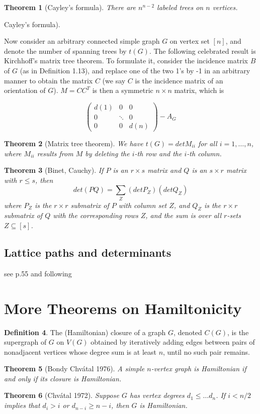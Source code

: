 \documentclass[11pt, fleqn, a4paper, landscape]{article}
\theoremstyle{plain} %
\newtheorem{thm}{Theorem}
\theoremstyle{remark} %
\theoremstyle{definition} %
\newtheorem{defi}[thm]{Definition}
\begin{document}
\begin{multicols}{3}
\begin{thm}[Cayley's formula]
There are $n^{n-2}$ labeled trees on $n$ vertices.
\end{thm}Cayley’s formula). 

Now consider an arbitrary connected simple graph $G$ on vertex set $[n]$, and denote the number of spanning trees by $t(G)$. The following celebrated result is Kirchhoff’s matrix tree theorem. To formulate it, consider the incidence matrix $B$ of $G$ (as in Definition 1.13), and replace one of the
two 1’s by -1 in an arbitrary manner to obtain the matrix $C$ (we say $C$ is the incidence matrix of an orientation of $G$). $ M = CC^T$ is then a symmetric $n \times n$ matrix, which is 

\[
\begin{pmatrix}
d(1) & 0 & 0  \\
0 & \ddots & 0  \\
0 & 0 & d(n)  
\end{pmatrix}-A_G\]

\begin{thm}[Matrix tree theorem]
We have $t(G) = det M_{ii}$ for all $i = 1, \dots , n$, where $M_{ii}$ results
from $M$ by deleting the $i$-th row and the $i$-th column.
\end{thm}

\begin{thm}[Binet,  Cauchy]
If $P$ is an $r \times s$ matrix and $Q$ is an $s \times r$ matrix with $r\le s$, then \[det(PQ) =\sum_Z (det P_Z)(detQ_Z)\]
where $P_Z$ is the $r\times r$ submatrix of $P$ with column set $Z$, and $Q_Z$ is the $r\times r$ submatrix of $Q$ with the corresponding rows $Z$, and the sum is over all $r$-sets $Z \subseteq [s]$.
\end{thm}

\subsection{Lattice paths and determinants}
see p.55 and following

\section{More Theorems on Hamiltonicity}
\begin{defi}
The (Hamiltonian) closure of a graph $G$, denoted $C(G)$, is the supergraph of $G$ on $V (G)$ obtained by iteratively adding edges between pairs of nonadjacent vertices whose degree sum is at least $n$, until no such pair remains.
\end{defi}
\begin{thm}[Bondy Chvátal 1976]
A simple $n$-vertex graph is Hamiltonian if and only if its closure is Hamiltonian.
\end{thm}
\begin{thm}[Chvátal 1972]
Suppose $G$ has vertex degrees $d_1\le \dots d_n$. If $i < n/2$ implies
that $d_i > i$ or $d_{n-i} \ge n - i$, then $G$ is Hamiltonian.
\end{thm}


\end{multicols}
\end{document}
